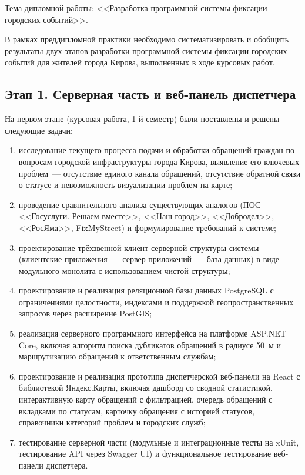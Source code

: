 Тема дипломной работы: <<Разработка программной системы фиксации городских событий>>.

В рамках преддипломной практики необходимо систематизировать и обобщить результаты
двух этапов разработки программной системы фиксации городских событий для жителей
города Кирова, выполненных в ходе курсовых работ.

\subsection{Этап 1. Серверная часть и веб-панель диспетчера}

На первом этапе (курсовая работа, 1-й семестр) были поставлены и решены следующие задачи:
\begin{enumerate}
    \item исследование текущего процесса подачи и обработки обращений граждан по вопросам
          городской инфраструктуры города Кирова, выявление его ключевых проблем~---
          отсутствие единого канала обращений, отсутствие обратной связи о статусе
          и невозможность визуализации проблем на карте;
    \item проведение сравнительного анализа существующих аналогов (ПОС <<Госуслуги.
          Решаем вместе>>, <<Наш город>>, <<Добродел>>, <<РосЯма>>, FixMyStreet)
          и формулирование требований к системе;
    \item проектирование трёхзвенной клиент-серверной структуры системы
          (клиентские приложения~--- сервер приложений~--- база данных) в виде модульного
          монолита с использованием чистой структуры;
    \item проектирование и реализация реляционной базы данных PostgreSQL
          с ограничениями целостности, индексами и поддержкой геопространственных
          запросов через расширение PostGIS;
    \item реализация серверного программного интерфейса на платформе ASP.NET Core,
          включая алгоритм поиска дубликатов обращений в радиусе 50~м и маршрутизацию
          обращений к ответственным службам;
    \item проектирование и реализация прототипа диспетчерской веб-панели на React с
          библиотекой Яндекс.Карты, включая дашборд со сводной статистикой,
          интерактивную карту обращений с фильтрацией, очередь обращений
          с вкладками по статусам, карточку обращения с историей статусов,
          справочники категорий проблем и городских служб;
    \item тестирование серверной части (модульные и интеграционные тесты на xUnit,
          тестирование API через Swagger UI) и функциональное тестирование
          веб-панели диспетчера.
\end{enumerate}

